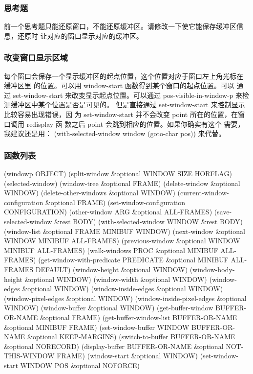 \documentclass[11pt]{ctexart}
\begin{document}
{{{{\subsubsection{思考题}
\label{sec:org23b32ea}
前一个思考题只能还原窗口，不能还原缓冲区。请修改一下使它能保存缓冲区信息，还原时
让对应的窗口显示对应的缓冲区。

\subsubsection{改变窗口显示区域}
\label{sec:org74a15f7}

每个窗口会保存一个显示缓冲区的起点位置，这个位置对应于窗口左上角光标在 缓冲区里
的位置。可以用 window-start 函数得到某个窗口的起点位置。可以
通 过 set-window-start 来改变显示起点位置。可以通过
pos-visible-in-window-p 来检测缓冲区中某个位置是否是可见的。
但是直接通过 set-window-start 来控制显示比较容易出现错误，因
为 set-window-start 并不会改变 point 所在的位置，在窗口调用
redisplay 函 数之后 point 会跳到相应的位置。如果你确实有这个
需要，我建议还是用： (with-selected-window window (goto-char
pos)) 来代替。

\subsubsection{函数列表}
\label{sec:org1e7ef6c}
(windowp OBJECT)
(split-window \&optional WINDOW SIZE HORFLAG)
(selected-window)
(window-tree \&optional FRAME)
(delete-window \&optional WINDOW)
(delete-other-windows \&optional WINDOW)
(current-window-configuration \&optional FRAME)
(set-window-configuration CONFIGURATION)
(other-window ARG \&optional ALL-FRAMES)
(save-selected-window \&rest BODY)
(with-selected-window WINDOW \&rest BODY)
(window-list \&optional FRAME MINIBUF WINDOW)
(next-window \&optional WINDOW MINIBUF ALL-FRAMES)
(previous-window \&optional WINDOW MINIBUF ALL-FRAMES)
(walk-windows PROC \&optional MINIBUF ALL-FRAMES)
(get-window-with-predicate PREDICATE \&optional MINIBUF ALL-FRAMES DEFAULT)
(window-height \&optional WINDOW)
(window-body-height \&optional WINDOW)
(window-width \&optional WINDOW)
(window-edges \&optional WINDOW)
(window-inside-edges \&optional WINDOW)
(window-pixel-edges \&optional WINDOW)
(window-inside-pixel-edges \&optional WINDOW)
(window-buffer \&optional WINDOW)
(get-buffer-window BUFFER-OR-NAME \&optional FRAME)
(get-buffer-window-list BUFFER-OR-NAME \&optional MINIBUF FRAME)
(set-window-buffer WINDOW BUFFER-OR-NAME \&optional KEEP-MARGINS)
(switch-to-buffer BUFFER-OR-NAME \&optional NORECORD)
(display-buffer BUFFER-OR-NAME \&optional NOT-THIS-WINDOW FRAME)
(window-start \&optional WINDOW)
(set-window-start WINDOW POS \&optional NOFORCE)
}}}}
\end{document}
